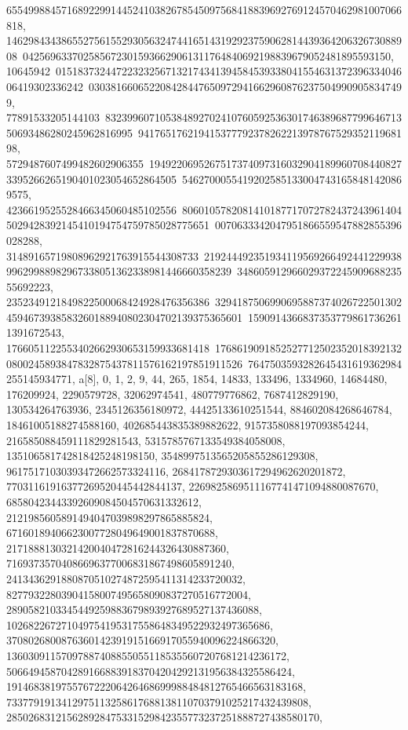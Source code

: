 {{{655499884571689229914452410382678545097568418839692769124570462981007066818, 
   14629843438655275615529305632474416514319292375906281443936420632673088908\
0425696337025856723015936629061311764840692198839679052481895593150, 10645942\
01518373244722323256713217434139458453933804155463137239633404606419302336242\
0303816606522084284476509729416629608762375049909058347499, 77891533205144103\
83239960710538489270241076059253630174638968779964671350693486280245962816995\
94176517621941537779237826221397876752935211968198, 5729487607499482602906355\
19492206952675173740973160329041899607084408273395266265190401023054652864505\
54627000554192025851330047431658481420869575, 4236619525528466345060485102556\
80601057820814101877170727824372439614045029428392145410194754759785028775651\
0070633342047951866559547882855396028288, 31489165719808962921763915544308733\
21924449235193411956926649244122993899629988982967338051362338981446660358239\
34860591296602937224590968823555692223, 2352349121849822500068424928476356386\
32941875069906958873740267225013024594673938583260188940802304702139375365601\
15909143668373537798617362611391672543, 1766051122553402662930653159933681418\
17686190918525277125023520183921320800245893847832875437811576162197851911526\
7647503593282645431619362984255145934771}}, 
 {a[8], {0, 1, 2, 9, 44, 265, 1854, 14833, 133496, 1334960, 14684480, 
   176209924, 2290579728, 32062974541, 480779776862, 7687412829190, 
   130534264763936, 2345126356180972, 44425133610251544, 884602084268646784, 
   18461005188274588160, 402685443835389882622, 9157358088197093854244, 
   216585088459111829281543, 5315785767133549384058008, 
   135106581742818425248198150, 3548997513565205855286129308, 
   96175171030393472662573324116, 2684178729303617294962620201872, 
   77031161916377269520445442844137, 2269825869511167741471094880087670, 
   68580423443392609084504570631332612, 
   2121985605891494047039898297865885824, 
   67160189406623007728049649001837870688, 
   2171888130321420040472816244326430887360, 
   71693735704086696377006831867498605891240, 
   2413436291880870510274872595411314233720032, 
   82779322803904158007495658090837270516772004, 
   2890582103345449259883679893927689527137436088, 
   102682267271049754195317558648349522932497365686, 
   3708026800876360142391915166917055940096224866320, 
   136030911570978874088550551185355607207681214236172, 
   5066494587042891668839183704204292131956384325586424, 
   191468381975576722206426468699988484812765466563183168, 
   7337791913412975113258617688138110703791025217432439808, 
   285026831215628928475331529842355773237251888727438580170, 
}}}
